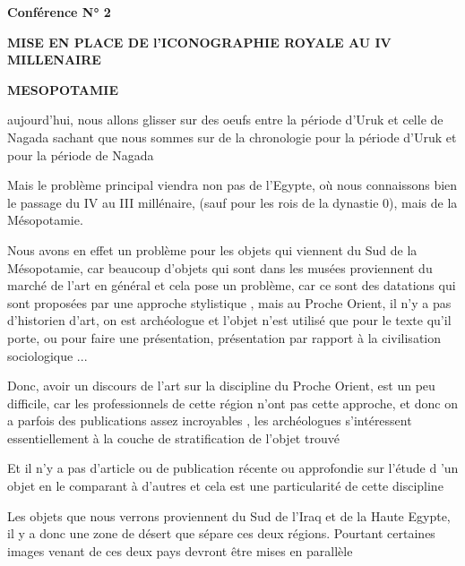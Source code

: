 \documentclass[a4paper,10pt]{article}
\begin{document}


\textbf{Conférence N° 2}

\textbf{MISE EN PLACE DE l'ICONOGRAPHIE ROYALE AU IV
MILLENAIRE}

\textbf{MESOPOTAMIE}

aujourd'hui, nous allons glisser sur des oeufs entre la
période d'Uruk et celle de Nagada sachant que nous
sommes sur de la chronologie pour la période d'Uruk et
pour la période de Nagada

Mais le problème principal viendra non pas de l'Egypte,
où nous connaissons bien le passage du IV au III millénaire, (sauf pour
les rois de la dynastie 0), mais de la Mésopotamie.

Nous avons en effet un problème pour les objets qui viennent du Sud de
la Mésopotamie, car beaucoup d'objets qui sont dans
les musées proviennent du marché de l'art en général
et cela pose un problème, car ce sont des datations qui sont proposées
par une approche stylistique , mais au Proche Orient, il
n'y a pas d'historien
d'art, on est archéologue et l'objet
n'est utilisé que pour le texte qu'il
porte, ou pour faire une présentation, présentation par rapport à la
civilisation sociologique ...

Donc, avoir un discours de l'art sur la discipline du
Proche Orient, est un peu difficile, car les professionnels de cette
région n'ont pas cette approche, et donc on a parfois
des publications assez incroyables , les archéologues
s'intéressent essentiellement à la couche de
stratification de l'objet trouvé

Et il n'y a pas d'article ou de
publication récente ou approfondie sur l'étude d
'un objet en le comparant à d'autres
et cela est une particularité de cette discipline

Les objets que nous verrons proviennent du Sud de
l'Iraq et de la Haute Egypte, il y a donc une zone de
désert que sépare ces deux régions. Pourtant certaines images venant de
ces deux pays devront être mises en parallèle
\end{document}
